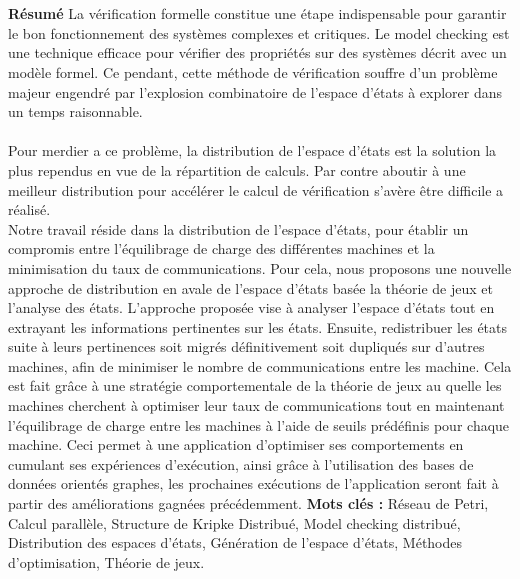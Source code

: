 \chapter*{}
\begin{changemargin}{3mm}{0cm}
    \begin{minipage}[c]{0.96\columnwidth}        

        
        {\LARGE\textbf{Résumé}}
        \vskip1mm
            \begingroup
                La vérification formelle constitue une étape indispensable pour garantir le bon fonctionnement des systèmes complexes et critiques. Le model checking est une technique efficace pour vérifier des propriétés sur des systèmes décrit avec un modèle formel. Ce pendant, cette méthode de vérification souffre d'un problème majeur engendré par l'explosion combinatoire de l'espace d'états à explorer  dans un temps raisonnable.
                \\\\
                Pour merdier a ce problème, la distribution de l'espace d'états est la solution la plus rependus  en vue de la répartition de calculs. Par contre aboutir à une meilleur distribution pour accélérer le calcul de vérification s'avère être difficile a réalisé.\\
                
                Notre travail réside dans la distribution de l'espace d'états, pour établir un compromis entre l’équilibrage de charge des différentes machines et la minimisation du taux de communications. Pour cela, nous proposons une nouvelle approche de distribution en avale de l'espace d'états basée la théorie de jeux et l'analyse des états. L’approche proposée vise à analyser l'espace d’états tout en extrayant les informations pertinentes sur les états. Ensuite, redistribuer les états suite à leurs pertinences soit migrés définitivement soit dupliqués sur d’autres machines, afin de minimiser le nombre de communications entre les machine. Cela est fait grâce à une stratégie comportementale de la théorie de jeux au quelle les machines cherchent à optimiser leur taux de communications tout en maintenant l'équilibrage de charge entre les machines à l’aide de seuils prédéfinis pour chaque machine. Ceci permet à une application d'optimiser ses comportements en cumulant ses expériences d’exécution, ainsi grâce à l'utilisation des bases de données orientés graphes, les prochaines exécutions de l’application seront fait à partir des améliorations gagnées précédemment.
            \endgroup
        \vskip1mm
        {\textbf{Mots clés : }
            \begingroup
                Réseau de Petri, Calcul parallèle, Structure de Kripke Distribué, Model checking distribué, Distribution des espaces d'états, 
                Génération de l’espace d’états, Méthodes d’optimisation, Théorie de jeux.
            \endgroup
        }
    \end{minipage}    
\end{changemargin}
\break
        
